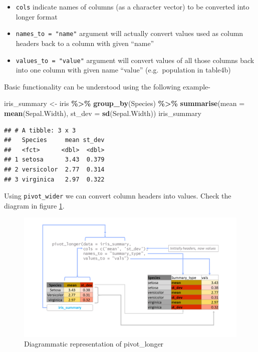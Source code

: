 \documentclass[
]{book}
\newenvironment{Shaded}{\begin{snugshade}}{\end{snugshade}}
\newcommand{\AttributeTok}[1]{\textcolor[rgb]{0.13,0.29,0.53}{#1}}
\newcommand{\FunctionTok}[1]{\textcolor[rgb]{0.13,0.29,0.53}{\textbf{#1}}}
\newcommand{\NormalTok}[1]{#1}
\newcommand{\OtherTok}[1]{\textcolor[rgb]{0.56,0.35,0.01}{#1}}
\newcommand{\SpecialCharTok}[1]{\textcolor[rgb]{0.81,0.36,0.00}{\textbf{#1}}}
\providecommand{\tightlist}{%
  \setlength{\itemsep}{0pt}\setlength{\parskip}{0pt}}
\begin{document}
\begin{itemize}
\tightlist
\item
  \texttt{cols} indicate names of columns (as a character vector) to be converted into longer format
\item
  \texttt{names\_to\ =\ "name"} argument will actually convert values used as column headers back to a column with given ``name''
\item
  \texttt{values\_to\ =\ "value"} argument will convert values of all those columns back into one column with given name ``value'' (e.g.~population in table4b)
\end{itemize}

Basic functionality can be understood using the following example-

\begin{Shaded}
\begin{Highlighting}[]
\NormalTok{iris\_summary }\OtherTok{\textless{}{-}}\NormalTok{ iris }\SpecialCharTok{\%\textgreater{}\%} 
  \FunctionTok{group\_by}\NormalTok{(Species) }\SpecialCharTok{\%\textgreater{}\%} 
  \FunctionTok{summarise}\NormalTok{(}\AttributeTok{mean =} \FunctionTok{mean}\NormalTok{(Sepal.Width),}
            \AttributeTok{st\_dev =} \FunctionTok{sd}\NormalTok{(Sepal.Width))}
\NormalTok{iris\_summary}
\end{Highlighting}
\end{Shaded}

\begin{verbatim}
## # A tibble: 3 x 3
##   Species     mean st_dev
##   <fct>      <dbl>  <dbl>
## 1 setosa      3.43  0.379
## 2 versicolor  2.77  0.314
## 3 virginica   2.97  0.322
\end{verbatim}

Using \texttt{pivot\_wider} we can convert column headers into values. Check the diagram in figure \ref{fig:plong}.

\begin{figure}

{\centering \includegraphics[width=0.99\linewidth]{images/pivot_longer} 

}

\caption{Diagrammatic representation of pivot\_longer}\label{fig:plong}
\end{figure}
\end{document}
